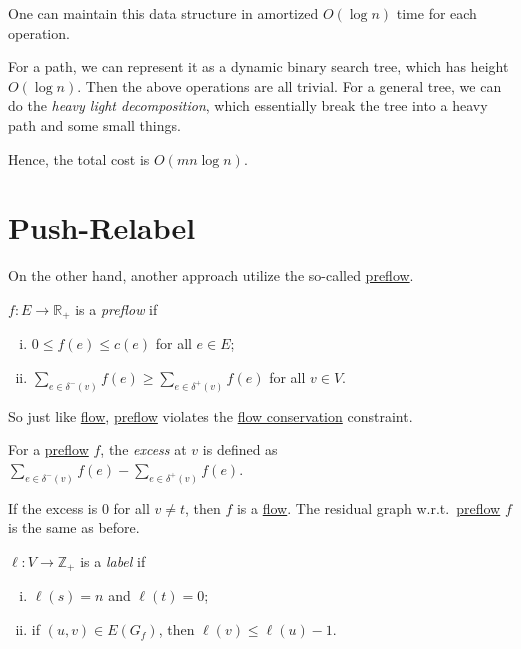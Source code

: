 One can maintain this data structure in amortized \(O(\log n)\) time for each operation.

\begin{intuition}
	For a path, we can represent it as a dynamic binary search tree, which has height \(O(\log n)\). Then the above operations are all trivial. For a general tree, we can do the \emph{heavy light decomposition}, which essentially break the tree into a heavy path and some small things.
\end{intuition}

Hence, the total cost is \(O(m n \log n)\).

\section{Push-Relabel}
On the other hand, another approach utilize the so-called \hyperref[def:preflow]{preflow}.\cite{goldberg1988new}

\begin{definition}[Preflow]\label{def:preflow}
	\(f \colon E \to \mathbb{R} _{+}\) is a \emph{preflow} if
	\begin{enumerate}[(i)]
		\item \(0 \leq f(e) \leq c(e)\) for all \(e \in E\);
		\item \(\sum_{e \in \delta ^-(v)} f(e) \geq \sum_{e \in \delta ^+(v)}f(e) \) for all \(v \in V\).
	\end{enumerate}
\end{definition}

So just like \hyperref[def:flow]{flow}, \hyperref[def:preflow]{preflow} violates the \hyperref[def:flow-conservation]{flow conservation} constraint.

\begin{notation}
	For a \hyperref[def:preflow]{preflow} \(f\), the \emph{excess} at \(v\) is defined as \(\sum_{e \in \delta ^-(v)} f(e) - \sum_{e \in \delta ^+(v)} f(e)\).
\end{notation}

If the excess is \(0\) for all \(v \neq t\), then \(f\) is a \hyperref[def:flow]{flow}. The residual graph w.r.t.\ \hyperref[def:preflow]{preflow} \(f\) is the same as before.

\begin{definition}[Label]\label{def:label}
	\(\ell \colon V \to \mathbb{Z} _{+}\) is a \emph{label} if
	\begin{enumerate}[(i)]
		\item \(\ell (s) = n\) and \(\ell (t) = 0\);
		\item if \((u, v) \in E(G_f)\), then \(\ell (v) \leq \ell (u) - 1\).
	\end{enumerate}
\end{definition}